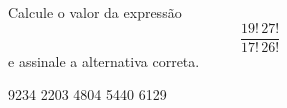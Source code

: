 Calcule o valor da expressão \[\frac{19!\,27!}{17!\,26!}\] e assinale a alternativa correta.

9234
2203
4804
5440
6129



